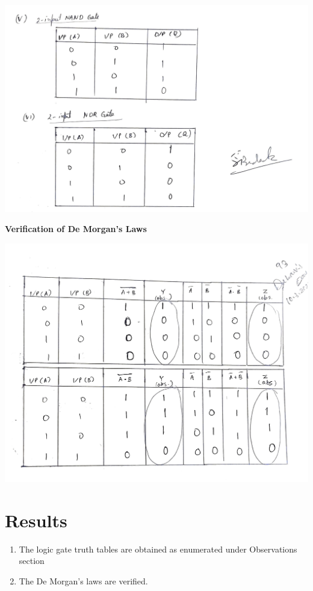 \clearpage
\begin{center}
    \includegraphics[scale = 0.2]{Documents/exp4tab1.5_1.jpg}
\end{center}
\begin{center}
    \textbf{Verification of De Morgan's Laws}
\end{center}
\begin{center}
    \includegraphics[scale = 0.16]{Documents/exp4tab2_1.jpg}
\end{center}
\section{Results}
\begin{enumerate}
    \item The logic gate truth tables are obtained as enumerated under Observations section
    \item The De Morgan's laws are verified.
\end{enumerate}
